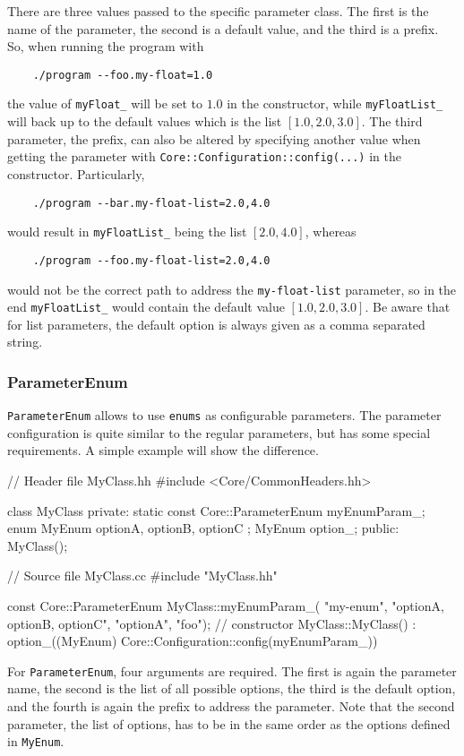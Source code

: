 There are three values passed to the specific parameter class. The first is the name of the parameter, the second is a default value, and the third is a prefix. So, when running the program with
\begin{verbatim}
    ./program --foo.my-float=1.0
\end{verbatim}
the value of \texttt{myFloat\_} will be set to $ 1.0 $ in the constructor, while \texttt{myFloatList\_} will back up to the default values which is the list $ [1.0, 2.0, 3.0] $. The third parameter, the prefix, can also be altered by specifying another value when getting the parameter with \texttt{Core::Configuration::config(...)} in the constructor. Particularly,
\begin{verbatim}
    ./program --bar.my-float-list=2.0,4.0
\end{verbatim}
would result in \texttt{myFloatList\_} being the list $ [2.0, 4.0] $, whereas
\begin{verbatim}
    ./program --foo.my-float-list=2.0,4.0
\end{verbatim}
would not be the correct path to address the \texttt{my-float-list} parameter, so in the end \texttt{myFloatList\_} would contain the default value $ [1.0, 2.0, 3.0] $. Be aware that for list parameters, the default option is always given as a comma separated string.

\subsubsection*{ParameterEnum}

\texttt{ParameterEnum} allows to use \texttt{enums} as configurable parameters. The parameter configuration is quite similar to the regular parameters, but has some special requirements. A simple example will show the difference.

\begin{code}
// Header file MyClass.hh
#include <Core/CommonHeaders.hh>

class MyClass {
private:
    static const Core::ParameterEnum myEnumParam_;
    enum MyEnum { optionA, optionB, optionC };
    MyEnum option_;
public:
    MyClass();
}
\end{code}

\begin{code}
// Source file MyClass.cc
#include "MyClass.hh"

const Core::ParameterEnum MyClass::myEnumParam_(
                       "my-enum", "optionA, optionB, optionC", "optionA", "foo");
// constructor
MyClass::MyClass() :
    option_((MyEnum) Core::Configuration::config(myEnumParam_))
{}
\end{code}
For \texttt{ParameterEnum}, four arguments are required. The first is again the parameter name, the second is the list of all possible options, the third is the default option, and the fourth is again the prefix to address the parameter. Note that the second parameter, the list of options, has to be in the same order as the options defined in \texttt{MyEnum}.


